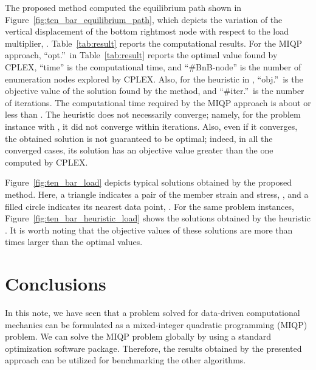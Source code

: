 \documentclass[a4paper,11pt]{scrartcl}
\theoremstyle{plain}
\theoremstyle{definition}
\theoremstyle{remark}
\newcommand{\reffig}[1]{Figure~\ref{#1}}
\newcommand{\reftab}[1]{Table~\ref{#1}}
\begin{document}
The proposed method computed the equilibrium path shown in 
\reffig{fig:ten_bar_equilibrium_path}, which depicts 
the variation of the vertical displacement of the bottom rightmost node 
with respect to the load multiplier, .  
\reftab{tab:result} reports the computational results. 
For the MIQP approach, 
``opt.''\ in \reftab{tab:result} reports the optimal value found by CPLEX, 
``time'' is the computational time, and 
``{\#}BnB-node'' is the number of enumeration nodes explored by CPLEX. 
Also, for the heuristic in \cite{KO16}, 
 ``obj.''\ is the objective value of the solution found by the method, and 
``{\#}iter.''\ is the number of iterations. 
The computational time required by the MIQP approach is about or less 
than . 
The heuristic \cite{KO16} does not necessarily converge; namely, 
for the problem instance with , it did not converge within 
 iterations. 
Also, even if it converges, the obtained solution is not guaranteed to 
be optimal; indeed, in all the converged cases, its solution has 
an objective value greater than the one computed by CPLEX. 

\reffig{fig:ten_bar_load} depicts typical solutions obtained by the 
proposed method. 
Here, a triangle indicates a pair of the member strain and stress, 
, 
and a filled circle indicates its nearest data point, 
. 
For the same problem instances, \reffig{fig:ten_bar_heuristic_load} 
shows the solutions obtained by the heuristic \cite{KO16}. 
It is worth noting that the objective values of these solutions are more 
than  times larger than the optimal values. 



























\section{Conclusions}
\label{sec:conclude}

In this note, we have seen that a problem solved for 
data-driven computational mechanics \cite{KO16} can be formulated as 
a mixed-integer quadratic programming (MIQP) problem. 
We can solve the MIQP problem globally by using a standard 
optimization software package. 
Therefore, the results obtained by the presented approach can be 
utilized for benchmarking the other algorithms. 
\end{document}
